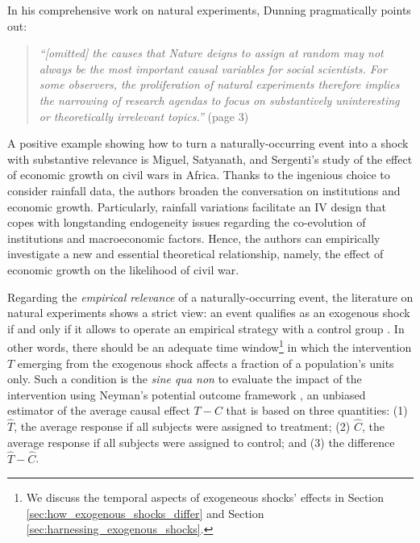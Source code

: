 \begin{refsection}
In his comprehensive work on natural experiments, Dunning 
\autocite*{dunning_2012} pragmatically points out:

\begin{quote}
  \textit{
  ``[omitted] the causes that Nature deigns to assign at random may not always be
  the most important causal variables for social scientists. For some observers,
  the proliferation of natural experiments therefore implies the narrowing of
  research agendas to focus on substantively uninteresting or theoretically
  irrelevant topics.''
  }
  (page 3)
\end{quote}

A positive example showing how to turn a naturally-occurring event into a shock
with substantive relevance is Miguel, Satyanath, and Sergenti's
\autocite*{miguel_et_al_2004} study of the effect of economic growth on civil
wars in Africa. Thanks to the ingenious choice to consider rainfall data,
the authors broaden the conversation on institutions and economic growth.
Particularly, rainfall variations facilitate an IV design that copes with
longstanding endogeneity issues regarding the co-evolution of institutions and
macroeconomic factors. Hence, the authors can empirically investigate a new
and essential theoretical relationship, namely, the effect of economic growth on
the likelihood of civil war. 

Regarding the \textit{empirical relevance} of a naturally-occurring event, the
literature on natural experiments shows a strict view: an event qualifies as an
exogenous shock if and only if it allows to operate an empirical strategy with
a control group \autocite[][]{cook_et_al_2002}. In other words, there should be
an adequate time window\footnote{We discuss the temporal aspects of exogeneous
shocks' effects in Section \ref{sec:how_exogenous_shocks_differ} and Section
\ref{sec:harnessing_exogenous_shocks}.} in which the intervention $T$ emerging
from the exogenous shock affects a fraction of a population's units only.  Such a
condition is the \textit{sine qua non} to evaluate the impact of the intervention
using Neyman's potential outcome framework \autocite*{neyman_et_al_1923}, an
unbiased estimator of the average causal effect $T - C$ that is based on three
quantities: (1) $\widehat{T}$, the average response if all subjects were assigned
to treatment; (2) $\widehat{C}$, the average response if all subjects were assigned
to control; and (3) the difference $\hat{T} - \widehat{C}$.


\end{refsection}
